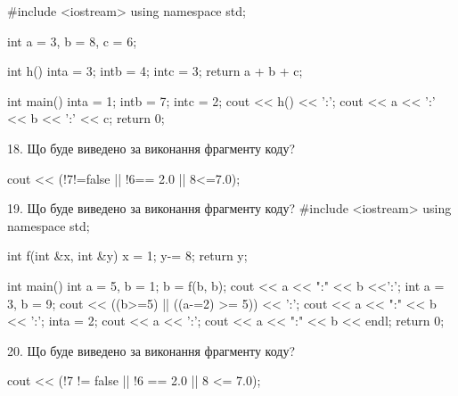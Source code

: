 \documentclass[11pt]{article}
\begin{document}
#include <iostream>
using namespace std;

int a = 3, b = 8, c = 6;

int h(){
    inta = 3;
    intb = 4;
    intc = 3;
    return a + b + c;
}

int main(){
    inta = 1;
    intb = 7;
    intc = 2;
    cout << h() << ':';
    cout << a << ':' << b << ':' << c;
    return 0;
}

18. Що буде виведено за виконання фрагменту коду?

cout << (!7!=false || !6== 2.0 || 8<=7.0);

19. Що буде виведено за виконання фрагменту коду?
#include <iostream>
using namespace std;

int f(int &x, int &y){
    x = 1;
    y-= 8;
    return y;
}

int main(){
    int a = 5, b = 1;
    b = f(b, b);
    cout << a << ":" << b <<':';
    {
        int a = 3, b = 9;
        cout << ((b>=5) || ((a-=2) >= 5)) << ':';
        cout << a << ":" << b << ':';
    }
    {
        inta = 2;
        cout << a << ':';
    }
    cout << a << ":" << b << endl;
    return 0;
}


20. Що буде виведено за виконання фрагменту коду?

cout << (!7 != false || !6 == 2.0 || 8 <= 7.0);





















\newpage
\end{document}

